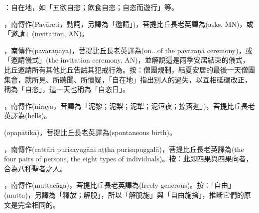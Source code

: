 \startitemgroup[noteitems]
\item{}：自在地，如「五欲自恣；飲食自恣；自恣而遊行」等。
\item{}，南傳作(Pavāreti，動詞，另譯為「邀請」)，菩提比丘長老英譯為(asks, MN)，或「邀請」(invitation, AN)。
\item{}，南傳作(pavāraṇāya)，菩提比丘長老英譯為(on...of the pavāraṇā ceremony)，或「邀請儀式」(the invitation ceremony, AN)，並解說這是雨季安居結束的儀式，比丘邀請所有其他比丘告誡其犯戒行為。按：僧團規制，結夏安居的最後一天僧團集會，就所見、所聽聞、所懷疑，「自在地」指出別人的過失，以互相砥礪改正，稱為「自恣」，這一天也稱為「自恣日」。
\stopitemgroup

\startitemgroup[noteitems]
\item{}，南傳作(niraya，音譯為「泥黎；泥梨；泥犁；泥洹夜；捺落迦」)，菩提比丘長老英譯為(hells)。
\stopitemgroup

\startitemgroup[noteitems]
\item{}(opapātikā)，菩提比丘長老英譯為(spontaneous birth)。
\stopitemgroup

\startitemgroup[noteitems]
\item{}，南傳作(cattāri purisayugāni aṭṭha purisapuggalā)，菩提比丘長老英譯為(the four pairs of persons, the eight types of individuals)。按：此即四果與四果向者，合為八種聖者之人。
\stopitemgroup

\startitemgroup[noteitems]
\item{}，南傳作(muttacāga)，菩提比丘長老英譯為(freely generous)。按：「自由」(mutta)，另譯為「釋放；解脫」，所以「解脫施」與「自由施捨」，推斷它們的原文是完全相同的。
\stopitemgroup

